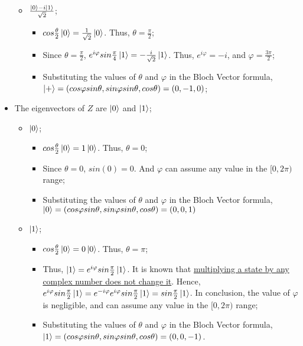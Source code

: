 \begin{itemize}
\begin{itemize}
        \item $\frac{\ket0 - i \ket1}{\sqrt2}$;
        \begin{itemize}
            \item $cos \frac \theta 2 \ket0 = \frac{1}{\sqrt2} \ket0$. Thus,
                $\theta = \frac \pi 2$;
            \item Since $\theta = \frac \pi 2$,
                $e^{i \varphi} sin \frac \pi 4 \ket1 = - \frac{i}{\sqrt2} \ket1$. Thus,
                $e^{i \varphi} = - i$, and $\varphi = \frac{3\pi}{2}$;
            \item Substituting the values of $\theta$ and $\varphi$ in the Bloch Vector formula,
                $\ket+ = (cos\varphi sin\theta, sin\varphi sin\theta, cos\theta) = (0, -1, 0)$;
        \end{itemize}
    \end{itemize}
    
    \item The eigenvectors of $Z$ are $\ket0$ and $\ket1$;
    \begin{itemize}
        \item $\ket0$;
        \begin{itemize}
            \item $cos \frac \theta 2 \ket0 = 1 \ket0$. Thus, $\theta = 0$;
            \item Since $\theta = 0$, $sin(0) = 0$. And
                $\varphi$ can assume any value in the $[0, 2\pi)$ range;
            \item Substituting the values of $\theta$ and $\varphi$ in the Bloch Vector formula,
                $\ket0 = (cos\varphi sin\theta, sin\varphi sin\theta, cos\theta) = (0, 0, 1)$
        \end{itemize}
        
        \item $\ket1$;
        \begin{itemize}
            \item $cos \frac \theta 2 \ket0 = 0 \ket0$. Thus, $\theta = \pi$;
            \item Thus, $\ket1 = e^{i \varphi} sin \frac \pi 2 \ket 1$.
                It is known that \hyperref[sec:noson-equation-4-5]{
                    multiplying a state by any complex number does not change it}.
                Hence, $e^{i \varphi} sin \frac \pi 2 \ket1 =
                    e^{-i \varphi} e^{i \varphi} sin \frac \pi 2 \ket1 =
                    sin \frac \pi 2 \ket1$.
                In conclusion, the value of $\varphi$ is negligible,
                and can assume any value in the $[0, 2\pi)$ range;
            \item Substituting the values of $\theta$ and $\varphi$ in the Bloch Vector formula,
                $\ket1 = (cos\varphi sin\theta, sin\varphi sin\theta, cos\theta) = (0, 0, -1)$.
        \end{itemize}
    \end{itemize}
\end{itemize}

